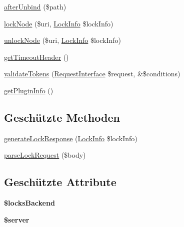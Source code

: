 \begin{DoxyCompactItemize}
\item 
\mbox{\hyperlink{class_sabre_1_1_d_a_v_1_1_locks_1_1_plugin_a67c30a24ab46aeb1c02f83305726bc1c}{after\+Unbind}} (\$path)
\item 
\mbox{\hyperlink{class_sabre_1_1_d_a_v_1_1_locks_1_1_plugin_a5207b64136f89db34b5290f1c342e603}{lock\+Node}} (\$uri, \mbox{\hyperlink{class_sabre_1_1_d_a_v_1_1_locks_1_1_lock_info}{Lock\+Info}} \$lock\+Info)
\item 
\mbox{\hyperlink{class_sabre_1_1_d_a_v_1_1_locks_1_1_plugin_a20c60a46f1836df762a90b741c8672a6}{unlock\+Node}} (\$uri, \mbox{\hyperlink{class_sabre_1_1_d_a_v_1_1_locks_1_1_lock_info}{Lock\+Info}} \$lock\+Info)
\item 
\mbox{\hyperlink{class_sabre_1_1_d_a_v_1_1_locks_1_1_plugin_a6f991c48301d5f0a2ccb446a63c8b8dd}{get\+Timeout\+Header}} ()
\item 
\mbox{\hyperlink{class_sabre_1_1_d_a_v_1_1_locks_1_1_plugin_aedbf55fbe92f575adf935b9070a43688}{validate\+Tokens}} (\mbox{\hyperlink{interface_sabre_1_1_h_t_t_p_1_1_request_interface}{Request\+Interface}} \$request, \&\$conditions)
\item 
\mbox{\hyperlink{class_sabre_1_1_d_a_v_1_1_locks_1_1_plugin_af11816cd98085097d7c55326f1660065}{get\+Plugin\+Info}} ()
\end{DoxyCompactItemize}
\subsection*{Geschützte Methoden}
\begin{DoxyCompactItemize}
\item 
\mbox{\hyperlink{class_sabre_1_1_d_a_v_1_1_locks_1_1_plugin_acf8e46a2928075324e4145e2b5f7c058}{generate\+Lock\+Response}} (\mbox{\hyperlink{class_sabre_1_1_d_a_v_1_1_locks_1_1_lock_info}{Lock\+Info}} \$lock\+Info)
\item 
\mbox{\hyperlink{class_sabre_1_1_d_a_v_1_1_locks_1_1_plugin_aad312df12435131521a106b077616415}{parse\+Lock\+Request}} (\$body)
\end{DoxyCompactItemize}
\subsection*{Geschützte Attribute}
\begin{DoxyCompactItemize}
\item 
\mbox{\label{class_sabre_1_1_d_a_v_1_1_locks_1_1_plugin_a291efb5a5e2c59423dd99f43a3b80721}} 
{\bfseries \$locks\+Backend}
\item 
\mbox{\label{class_sabre_1_1_d_a_v_1_1_locks_1_1_plugin_a0ebff466108baca49d552a818b972776}} 
{\bfseries \$server}
\end{DoxyCompactItemize}


